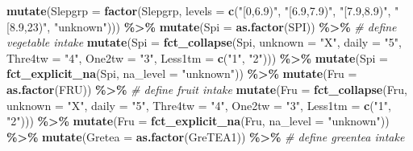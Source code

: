 \documentclass[
]{article}
\newenvironment{Shaded}{\begin{snugshade}}{\end{snugshade}}
\newcommand{\CommentTok}[1]{\textcolor[rgb]{0.56,0.35,0.01}{\textit{#1}}}
\newcommand{\DataTypeTok}[1]{\textcolor[rgb]{0.13,0.29,0.53}{#1}}
\newcommand{\KeywordTok}[1]{\textcolor[rgb]{0.13,0.29,0.53}{\textbf{#1}}}
\newcommand{\NormalTok}[1]{#1}
\newcommand{\OperatorTok}[1]{\textcolor[rgb]{0.81,0.36,0.00}{\textbf{#1}}}
\newcommand{\StringTok}[1]{\textcolor[rgb]{0.31,0.60,0.02}{#1}}
\begin{document}
\begin{Shaded}
\begin{Highlighting}[]
\StringTok{  }\KeywordTok{mutate}\NormalTok{(}\DataTypeTok{Slepgrp =} \KeywordTok{factor}\NormalTok{(Slepgrp, }\DataTypeTok{levels =} \KeywordTok{c}\NormalTok{(}\StringTok{"[0,6.9)"}\NormalTok{,}
                                            \StringTok{"[6.9,7.9)"}\NormalTok{,}
                                            \StringTok{"[7.9,8.9)"}\NormalTok{, }
                                            \StringTok{"[8.9,23)"}\NormalTok{, }\StringTok{"unknown"}\NormalTok{))) }\OperatorTok{\%\textgreater{}\%}\StringTok{ }
\StringTok{  }\KeywordTok{mutate}\NormalTok{(}\DataTypeTok{Spi =} \KeywordTok{as.factor}\NormalTok{(SPI)) }\OperatorTok{\%\textgreater{}\%}\StringTok{ }\CommentTok{\# define vegetable intake}
\StringTok{  }\KeywordTok{mutate}\NormalTok{(}\DataTypeTok{Spi =} \KeywordTok{fct\_collapse}\NormalTok{(Spi, }
                            \DataTypeTok{unknown =} \StringTok{"X"}\NormalTok{, }
                            \DataTypeTok{daily =} \StringTok{"5"}\NormalTok{,}
                            \DataTypeTok{Thre4tw =} \StringTok{"4"}\NormalTok{,}
                            \DataTypeTok{One2tw =} \StringTok{"3"}\NormalTok{,}
                            \DataTypeTok{Less1tm =} \KeywordTok{c}\NormalTok{(}\StringTok{"1"}\NormalTok{, }\StringTok{"2"}\NormalTok{))) }\OperatorTok{\%\textgreater{}\%}\StringTok{ }
\StringTok{  }\KeywordTok{mutate}\NormalTok{(}\DataTypeTok{Spi =} \KeywordTok{fct\_explicit\_na}\NormalTok{(Spi, }\DataTypeTok{na\_level =} \StringTok{"unknown"}\NormalTok{)) }\OperatorTok{\%\textgreater{}\%}\StringTok{ }
\StringTok{  }\KeywordTok{mutate}\NormalTok{(}\DataTypeTok{Fru =} \KeywordTok{as.factor}\NormalTok{(FRU)) }\OperatorTok{\%\textgreater{}\%}\StringTok{ }\CommentTok{\# define fruit intake}
\StringTok{  }\KeywordTok{mutate}\NormalTok{(}\DataTypeTok{Fru =} \KeywordTok{fct\_collapse}\NormalTok{(Fru, }
                            \DataTypeTok{unknown =} \StringTok{"X"}\NormalTok{,}
                            \DataTypeTok{daily =} \StringTok{"5"}\NormalTok{,}
                            \DataTypeTok{Thre4tw =} \StringTok{"4"}\NormalTok{,}
                            \DataTypeTok{One2tw =} \StringTok{"3"}\NormalTok{,}
                            \DataTypeTok{Less1tm =} \KeywordTok{c}\NormalTok{(}\StringTok{"1"}\NormalTok{, }\StringTok{"2"}\NormalTok{))) }\OperatorTok{\%\textgreater{}\%}\StringTok{ }
\StringTok{  }\KeywordTok{mutate}\NormalTok{(}\DataTypeTok{Fru =} \KeywordTok{fct\_explicit\_na}\NormalTok{(Fru, }\DataTypeTok{na\_level =} \StringTok{"unknown"}\NormalTok{)) }\OperatorTok{\%\textgreater{}\%}\StringTok{ }
\StringTok{  }\KeywordTok{mutate}\NormalTok{(}\DataTypeTok{Gretea =} \KeywordTok{as.factor}\NormalTok{(GreTEA1)) }\OperatorTok{\%\textgreater{}\%}\StringTok{ }\CommentTok{\# define greentea intake}

\end{Highlighting}
\end{Shaded}
\end{document}
